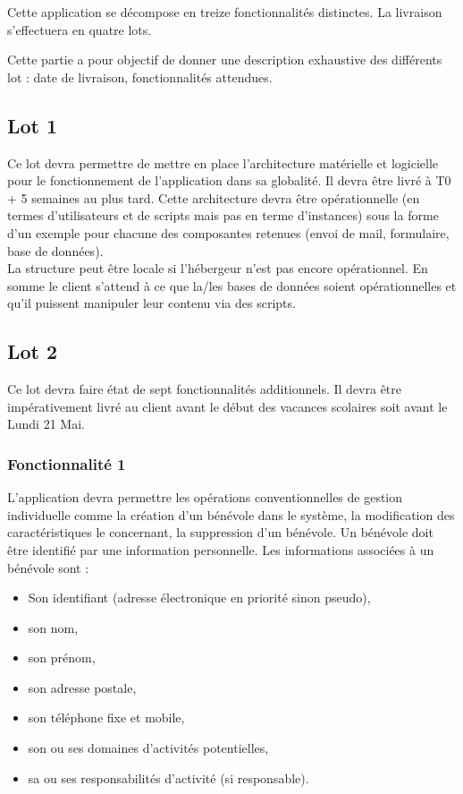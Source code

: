 \label{spec_fonct}

Cette application se décompose en treize fonctionnalités distinctes. La livraison s'effectuera en quatre lots.

Cette partie a pour objectif de donner une description exhaustive des différents lot : 
date de livraison, fonctionnalités attendues. 
\\ 

\subsection{Lot 1}


Ce lot devra permettre de mettre en place l'architecture matérielle et logicielle pour le fonctionnement de l'application dans sa globalité.
 Il devra être livré à T0 + 5 semaines au plus tard. Cette architecture devra être opérationnelle (en termes d'utilisateurs et de scripts mais pas en terme d'instances) sous la forme d'un exemple pour chacune des composantes retenues (envoi de mail, formulaire, base de données). 
 \\
 La structure peut être locale si l'hébergeur n'est pas encore opérationnel.
En somme le client s'attend à ce que la/les bases de données soient opérationnelles et qu'il puissent manipuler leur contenu via des scripts.
\\


\subsection{Lot 2}
Ce lot devra faire état de sept fonctionnalités additionnels. Il devra être impérativement livré au client avant le début des vacances scolaires soit avant le Lundi 21 Mai.

\subsubsection{Fonctionnalité 1}
L'application devra permettre les opérations conventionnelles de gestion
individuelle comme la création d'un bénévole dans le système, la modification des caractéristiques le concernant, la suppression d'un bénévole.
Un bénévole doit être identifié par une information personnelle. 
Les informations associées à un bénévole sont :
\begin{itemize}
\item Son identifiant (adresse électronique en priorité sinon pseudo), \\
\item son nom, \\
\item son prénom, \\
\item son adresse postale, \\
\item son téléphone fixe et mobile, \\
\item son ou ses domaines d'activités potentielles, \\
\item sa ou ses responsabilités d'activité (si responsable). \\
\end{itemize}

